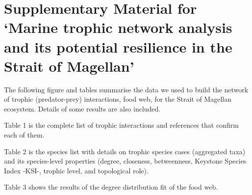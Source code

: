 \documentclass[
]{article}
\author{}
\date{\vspace{-2.5em}}
\begin{document}
\section{Supplementary Material for `Marine trophic network analysis and
its potential resilience in the Strait of
Magellan'}\label{supplementary-material-for-marine-trophic-network-analysis-and-its-potential-resilience-in-the-strait-of-magellan}

The following figure and tables summarise the data we used to build the
network of trophic (predator-prey) interactions, food web, for the
Strait of Magellan ecosystem. Details of some results are also included.

Table 1 is the complete list of trophic interactions and references that
confirm each of them.

Table 2 is the species list with details on trophic species cases
(aggregated taxa) and its species-level properties (degree, closeness,
betweenness, Keystone Species Index -KSI-, trophic level, and
topological role).

Table 3 shows the results of the degree distribution fit of the food
web.
\end{document}
